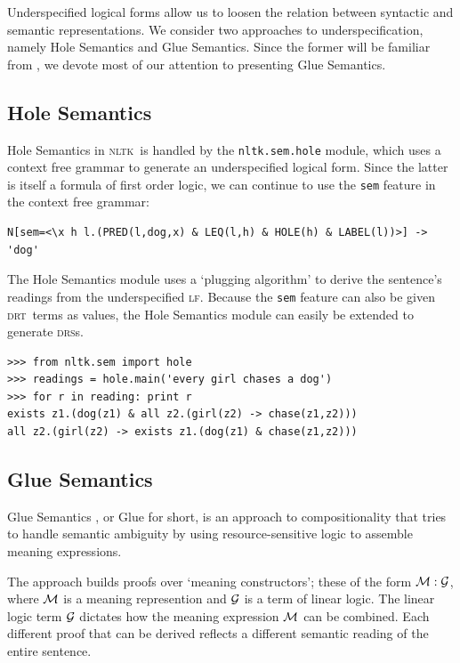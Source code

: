 \documentclass[11pt,a4paper]{article}
\newcommand{\DRS}{\textsc{drs}}
\newcommand{\DRT}{\textsc{drt}}
\newcommand{\NLTK}{\textsc{nltk}}
\newcommand{\LF}{\textsc{lf}}
\newcommand{\dhgcode}[1]{{\tt #1}}
\begin{document}
Underspecified logical forms allow us to loosen the relation between
syntactic and semantic representations. We consider two approaches to
underspecification, namely Hole
Semantics and Glue Semantics. Since the former will be familiar from 
\citep{BB}, we devote most of our attention to presenting Glue
Semantics.

\subsection{Hole Semantics}

Hole Semantics in \NLTK\ is handled by the
\dhgcode{nltk.sem.hole} module, which uses a context free grammar to
generate an underspecified logical form.  Since the latter is itself a
formula of first order logic, we can continue to use the \texttt{sem} feature
in the context free grammar:

\small
\begin{verbatim}
N[sem=<\x h l.(PRED(l,dog,x) & LEQ(l,h) & HOLE(h) & LABEL(l))>] -> 'dog'
\end{verbatim}
\normalsize

The Hole Semantics module uses a `plugging algorithm' to derive the
sentence's readings from the underspecified \LF.  Because the \texttt{sem}
feature can also be given \DRT\ terms as values, the Hole Semantics module can
easily be extended to generate \DRS s.

\begin{verbatim}
>>> from nltk.sem import hole
>>> readings = hole.main('every girl chases a dog')
>>> for r in reading: print r
exists z1.(dog(z1) & all z2.(girl(z2) -> chase(z1,z2)))
all z2.(girl(z2) -> exists z1.(dog(z1) & chase(z1,z2)))
\end{verbatim}


\subsection{Glue Semantics}
Glue Semantics \citep{Dalrymple:1999:RRB,Dalrymple2001}, or Glue for
short, is an approach
to compositionality that tries to handle semantic ambiguity by using resource-sensitive logic to assemble meaning
expressions.  

The approach builds proofs over `meaning constructors'; these of the
form $\cal{M}: \cal{G}$, where $\cal{M}$ is a meaning represention and
$\cal{G}$ is a term of linear logic.  The linear logic term $\cal{G}$
dictates how the meaning expression $\cal{M}$ can be combined.  Each
different proof that can be derived reflects a different semantic
reading of the entire sentence.
\end{document}
